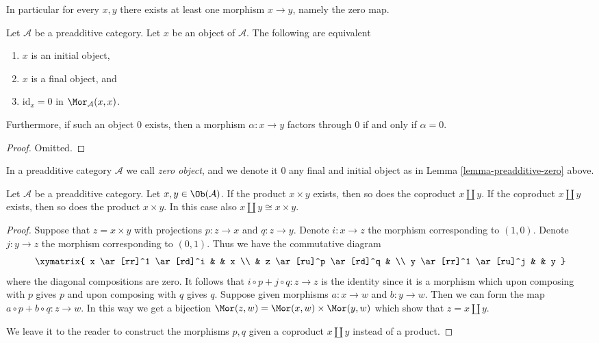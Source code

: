 \noindent
In particular for every $x, y$ there exists at least
one morphism $x \to y$, namely the zero map.

\begin{lemma}
\label{lemma-preadditive-zero}
Let $\mathcal{A}$ be a preadditive category.
Let $x$ be an object of $\mathcal{A}$.
The following are equivalent
\begin{enumerate}
\item $x$ is an initial object,
\item $x$ is a final object, and
\item $\text{id}_x = 0$ in $\Mor_\mathcal{A}(x, x)$.
\end{enumerate}
Furthermore, if such an object $0$ exists, then a morphism
$\alpha : x \to y$ factors through $0$ if and only if $\alpha = 0$.
\end{lemma}

\begin{proof}
Omitted.
\end{proof}

\begin{definition}
\label{definition-zero-object}
In a preadditive category $\mathcal{A}$ we call
{\it zero object}, and we denote it $0$
any final and initial object as in Lemma \ref{lemma-preadditive-zero} above.
\end{definition}

\begin{lemma}
\label{lemma-preadditive-direct-sum}
Let $\mathcal{A}$ be a preadditive category.
Let $x, y \in \Ob(\mathcal{A})$.
If the product $x \times y$ exists, then so does
the coproduct $x \amalg y$.
If the coproduct $x \amalg y$ exists, then so does
the product $x \times y$. In this case
also $x \amalg y \cong x \times y$.
\end{lemma}

\begin{proof}
Suppose that $z = x \times y$ with projections
$p : z \to x$ and $q : z \to y$. Denote $i : x \to z$
the morphism corresponding to $(1, 0)$. Denote $j : y \to z$
the morphism corresponding to $(0, 1)$. Thus we have the
commutative diagram
$$
\xymatrix{
x \ar[rr]^1 \ar[rd]^i & & x \\
& z \ar[ru]^p \ar[rd]^q & \\
y \ar[rr]^1 \ar[ru]^j & & y
}
$$
where the diagonal compositions are zero. It follows that
$i \circ p + j \circ q : z \to z$ is the identity since
it is a morphism which upon composing with $p$ gives $p$
and upon composing with $q$ gives $q$.
Suppose given morphisms $a : x \to w$ and $b : y \to w$.
Then we can form the map $a \circ p + b \circ q : z \to w$.
In this way we get a bijection $\Mor(z, w)
= \Mor(x, w) \times \Mor(y, w)$ which
show that $z = x \amalg y$.

\medskip\noindent
We leave it to the reader to construct the morphisms
$p, q$ given a coproduct $x \amalg y$ instead of a
product.
\end{proof}

